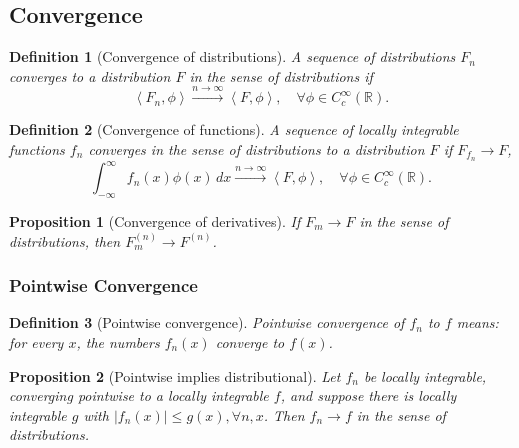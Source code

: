 \documentclass{article}
\newtheorem{definition}{Definition}
\newtheorem{proposition}{Proposition}
\newcommand{\R}{\mathbb{R}}
\newcommand{\D}{C_c^\infty(\R)}
\newcommand{\ip}[2]{\left\langle #1, #2 \right\rangle}
\newcommand{\intinf}{\int_{-\infty}^{\infty}}
\begin{document}
\subsection{Convergence}
\begin{definition}[Convergence of distributions]
    A sequence of distributions $F_n$ converges to a distribution $F$ in the sense of distributions if
    \[\ip{F_n}{\phi}\overset{n\to\infty}{\to}\ip{F}{\phi},\quad \forall \phi\in\D.\]
\end{definition}
\begin{definition}[Convergence of functions]
    A sequence of locally integrable functions $f_n$ converges in the sense of distributions to a distribution $F$ if $F_{f_n}\to F$,
    \begin{equation}
        \intinf f_n(x)\phi(x)\,dx \overset{n\to\infty}{\to}\ip{F}{\phi},\quad \forall\phi\in\D.
    \end{equation}
\end{definition}
\begin{proposition}[Convergence of derivatives]
    \label{prop:derivatives-converge}
    If $F_m\to F$ in the sense of distributions, then $F_m^{(n)}\to F^{(n)}$.
\end{proposition}

\subsubsection{Pointwise Convergence}
\begin{definition}[Pointwise convergence]
    Pointwise convergence of $f_n$ to $f$ means: for every $x$, the numbers $f_n(x)$ converge to $f(x)$.
\end{definition}
\begin{proposition}[Pointwise implies distributional]
    Let $f_n$ be locally integrable, converging pointwise to a locally integrable $f$, and suppose there is locally integrable $g$ with $|f_n(x)|\leq g(x), \forall n,x$. Then $f_n\to f$ in the sense of distributions.
\end{proposition}
\end{document}
